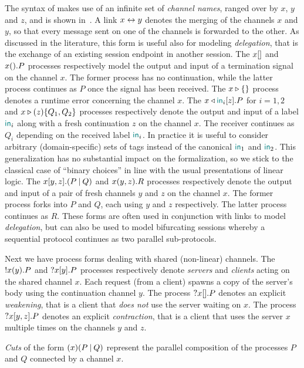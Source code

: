 The syntax of \Calculus makes use of an infinite set of \emph{channel names},
ranged over by $x$, $y$ and $z$, and is shown in~.
%
A link $x\leftrightarrow y$ denotes the merging of the channels $x$ and $y$, so that
every message sent on one of the channels is forwarded to the other. As
discussed in the literature, this form is useful also for modeling
\emph{delegation}, that is the exchange of an existing session endpoint in
another session.
%
The $x[]$ and $x().P$ processes respectively model the output and input
of a termination signal on the channel $x$. The former process has no
continuation, while the latter process continues as $P$ once the signal has been
received.
%
The $x \triangleright \{\}$ process denotes a runtime error concerning the channel $x$.
%
The $\Select\x{\InTag_i}\z.P$ for $i=1,2$ and $\Case\x\z{Q_1}{Q_2}$ processes
respectively denote the output and input of a label $\mathsf{\color{teal}in}_i$ along with a
fresh continuation $z$ on the channel $x$. The receiver continues as $Q_i$
depending on the received label $\mathsf{\color{teal}in}_i$. In practice it is useful to consider
arbitrary (domain-specific) sets of tags instead of the canonical $\mathsf{\color{teal}in}_1$ and
$\mathsf{\color{teal}in}_2$. This generalization has no substantial impact on the formalization,
so we stick to the classical case of ``binary choices'' in line with the usual
presentations of linear logic.
%
The $\Fork\x\y\z{P}{Q}$ and $\Join\x\y\z.R$ processes respectively denote the
output and input of a pair of fresh channels $y$ and $z$ on the channel $x$. The
former process forks into $P$ and $Q$, each using $y$ and $z$ respectively. The
latter process continues as $R$. These forms are often used in conjunction with
links to model \emph{delegation}, but can also be used to model bifurcating
sessions whereby a sequential protocol continues as two parallel sub-protocols.

Next we have process forms dealing with shared (non-linear) channels. The
${!}x(y).P$ and ${?}x[y].P$ processes respectively denote \emph{servers}
and \emph{clients} acting on the shared channel $x$. Each request (from a
client) spawns a copy of the server's body using the continuation channel $y$.
The process ${?}x[].P$ denotes an explicit \emph{weakening}, that is a client
that \emph{does not} use the server waiting on $x$. The process
${?}x[y,z].P$ denotes an explicit \emph{contraction}, that is a client
that uses the server $x$ multiple times on the channels $y$ and $z$.

\emph{Cuts} of the form $(x)(P\mathbin| Q)$ represent the parallel composition of the
processes $P$ and $Q$ connected by a channel $x$.

